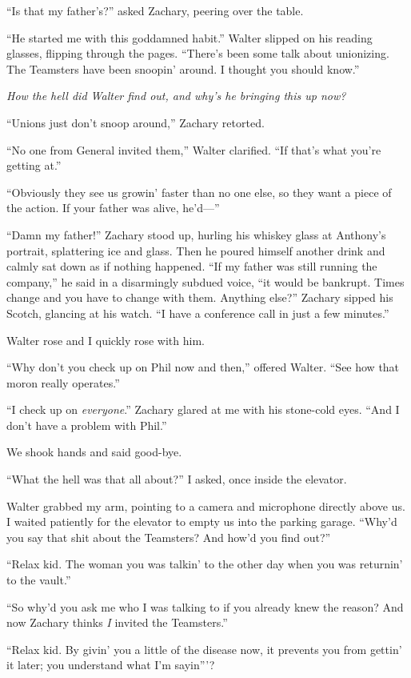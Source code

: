 ``Is that my father's?'' asked Zachary, peering over the table.

``He started me with this goddamned habit.'' Walter slipped on his
reading glasses, flipping through the pages. ``There's been some talk
about unionizing. The Teamsters have been snoopin' around. I thought you
should know.''

\emph{How the hell did Walter find out, and why's he bringing this up
now?}

``Unions just don't snoop around,'' Zachary retorted.

``No one from General invited them,'' Walter clarified. ``If that's what
you're getting at.''

``Obviously they see us growin' faster than no one else, so they want a
piece of the action. If your father was alive, he'd---''

``Damn my father!'' Zachary stood up, hurling his whiskey glass at
Anthony's portrait, splattering ice and glass. Then he poured himself
another drink and calmly sat down as if nothing happened. ``If my father
was still running the company,'' he said in a disarmingly subdued voice,
``it would be bankrupt. Times change and you have to change with them.
Anything else?'' Zachary sipped his Scotch, glancing at his watch. ``I
have a conference call in just a few minutes.''

Walter rose and I quickly rose with him.

``Why don't you check up on Phil now and then,'' offered Walter. ``See
how that moron really operates.''

``I check up on \emph{everyone}.'' Zachary glared at me with his
stone-cold eyes. ``And I don't have a problem with Phil.''

We shook hands and said good-bye.

``What the hell was that all about?'' I asked, once inside the elevator.

Walter grabbed my arm, pointing to a camera and microphone directly
above us. I waited patiently for the elevator to empty us into the
parking garage. ``Why'd you say that shit about the Teamsters? And how'd
you find out?''

``Relax kid. The woman you was talkin' to the other day when you was
returnin' to the vault.''

``So why'd you ask me who I was talking to if you already knew the
reason? And now Zachary thinks \emph{I} invited the Teamsters.''

``Relax kid. By givin' you a little of the disease now, it prevents you
from gettin' it later; you understand what I'm sayin'''?

